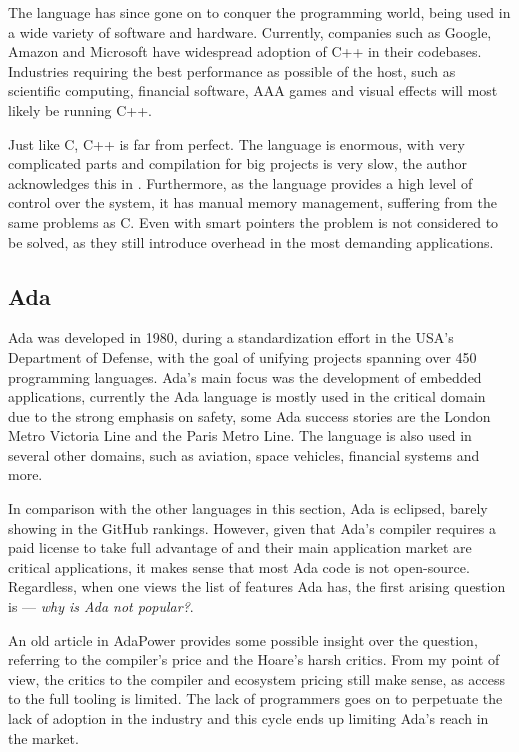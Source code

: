 The language has since gone on to conquer the programming world, being used in a wide variety of software and hardware.
Currently, companies such as Google, Amazon and Microsoft have widespread adoption of C++ in their codebases.
Industries requiring the best performance as possible of the host, such as scientific computing,
financial software, AAA games and visual effects will most likely be running C++.

Just like C, C++ is far from perfect.
The language is enormous, with very complicated parts  and compilation for big projects is very slow,
the author acknowledges this in \autocite{Torre2014}.
Furthermore, as the language provides a high level of control over the system, it has manual memory management,
suffering from the same problems as C.
Even with smart pointers  the problem is not considered to be solved,
as they still introduce overhead in the most demanding applications.


\subsection{Ada}

Ada was developed in 1980, during a standardization effort in the USA's Department of Defense,
with the goal of unifying projects spanning over 450 programming languages.
Ada's main focus was the development of embedded applications,
currently the Ada language is mostly used in the critical domain due to the strong emphasis on safety,
some Ada success stories are the London Metro Victoria Line and the Paris Metro Line.
The language is also used in several other domains, such as aviation, space vehicles, financial systems and more.

In comparison with the other languages in this section, Ada is eclipsed, barely showing in the GitHub rankings.
However, given that Ada's compiler requires a paid license to take full advantage of and their main application market are critical applications,
it makes sense that most Ada code is not open-source.
Regardless, when one views the list of features Ada has, the first arising question is --- \emph{why is Ada not popular?}.

An old article in AdaPower provides some possible insight over the question,
referring to the compiler's price and the Hoare's harsh critics.
From my point of view, the critics to the compiler and ecosystem pricing still make sense,
as access to the full tooling is limited.
The lack of programmers goes on to perpetuate the lack of adoption in the industry
and this cycle ends up limiting Ada's reach in the market.


